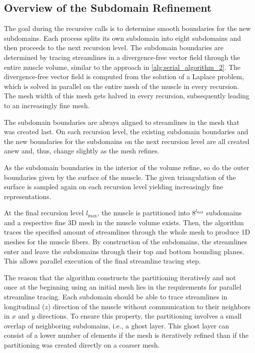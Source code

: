 \subsection{Overview of the Subdomain Refinement}

The goal during the recursive calls is to determine smooth boundaries for the new subdomains. Each process splits its own subdomain into eight subdomains and then proceeds to the next recursion level.
The subdomain boundaries are determined by tracing streamlines in a divergence-free vector field through the entire muscle volume, similar to the approach in \cref{alg:serial_algorithm_2}. The divergence-free vector field is computed from the solution of a Laplace problem, which is solved in parallel on the entire mesh of the muscle in every recursion. The mesh width of this mesh gets halved in every recursion, subsequently leading to an increasingly fine mesh.

The subdomain boundaries are always aligned to streamlines in the mesh that was created last.
On each recursion level, the existing subdomain boundaries and the new boundaries for the subdomains on the next recursion level are all created anew and, thus, change slightly as the mesh refines.

As the subdomain boundaries in the interior of the volume refine, so do the outer boundaries given by the surface of the muscle. The given triangulation of the surface is sampled again on each recursion level yielding increasingly fine representations.

At the final recursion level $l_\text{max}$, the muscle is partitioned into $8^{l_\text{max}}$ subdomains and a respective fine 3D mesh in the muscle volume exists. Then, the algorithm traces the specified amount of streamlines through the whole mesh to produce 1D meshes for the muscle fibers. By construction of the subdomains, the streamlines enter and leave the subdomains through their top and bottom bounding planes. This allows parallel execution of the final streamline tracing step.

The reason that the algorithm constructs the partitioning iteratively and not once at the beginning using an initial mesh lies in the requirements for parallel streamline tracing. Each subdomain should be able to trace streamlines in longitudinal ($z$) direction of the muscle without communication to their neighbors in $x$ and $y$ directions. To ensure this property, the partitioning involves a small overlap of neighboring subdomains, i.e., a ghost layer. This ghost layer can consist of a lower number of elements if the mesh is iteratively refined than if the partitioning was created directly on a coarser mesh.

